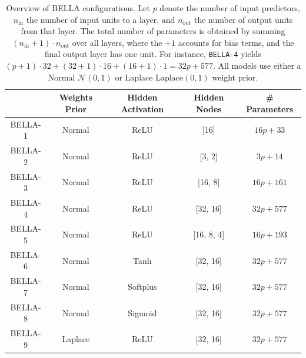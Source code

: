 \begin{table}[h]
\centering
\begin{tabular}{c c c c c}
\toprule
 & Weights Prior & Hidden Activation & Hidden Nodes & \# Parameters \\
\midrule
BELLA-1 & Normal   & ReLU     & [16]        & $16p + 33$ \\
BELLA-2 & Normal   & ReLU     & [3, 2]      & $3p + 14$ \\
BELLA-3 & Normal   & ReLU     & [16, 8]     & $16p + 161$ \\
BELLA-4 & Normal   & ReLU     & [32, 16]    & $32p + 577$ \\
BELLA-5 & Normal   & ReLU     & [16, 8, 4]  & $16p + 193$ \\
BELLA-6 & Normal   & Tanh     & [32, 16]    & $32p + 577$ \\
BELLA-7 & Normal   & Softplus & [32, 16]    & $32p + 577$ \\
BELLA-8 & Normal   & Sigmoid  & [32, 16]    & $32p + 577$ \\
BELLA-9 & Laplace  & ReLU     & [32, 16]    & $32p + 577$ \\
\bottomrule
\end{tabular}
\caption{Overview of BELLA configurations. Let $p$ denote the number of input predictors, $n_{\text{in}}$ the number of input units to a layer, and $n_{\text{out}}$ the number of output units from that layer. The total number of parameters is obtained by summing $(n_{\text{in}}+1)\cdot n_{\text{out}}$ over all layers, where the $+1$ accounts for bias terms, and the final output layer has one unit. For instance, \texttt{BELLA-4} yields $(p+1)\cdot32 + (32+1)\cdot16 + (16+1)\cdot1 = 32p + 577$. All models use either a Normal $\mathcal{N}(0,1)$ or Laplace $\mathrm{Laplace}(0,1)$ weight prior.}
\label{tab:models}
\end{table}